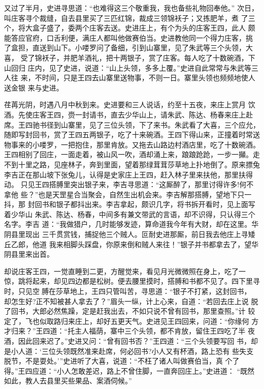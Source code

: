又过了半月，史进寻思道：“也难得这三个敬重我，我也备些礼物回奉他。”
次日，叫庄客寻个裁缝，自去县里买了三匹红锦，裁成三领锦袄子；又拣肥羊，煮
了三个，将大盒子盛了，委两个庄客去送。史进庄上，有个为头的庄客王四，此人
颇能答应官府，口舌利便，满庄人都叫他做赛伯当。史进教他同一个得力庄客，挑
了盒担，直送到山下。小喽罗问了备细，引到山寨里，见了朱武等三个头领，大喜，
受了锦袄子，并肥羊酒礼，把十两银子，赏了庄客。每人吃了十数碗酒，下山回归
庄内，见了史进，说道：“山上头领，多多上覆。”史进自此常常与朱武等三人往
来，不时间，只是王四去山寨里送物事，不则一日。寨里头领也频频地使人送金银
来与史进。

荏苒光阴，时遇八月中秋到来。史进要和三人说话，约至十五夜，来庄上赏月
饮酒。先使庄客王四，赍一封请书，直去少华山上，请朱武、陈达、杨春来庄上赴
席。王四驰书径到山寨里，见了三位头领，下了来书。朱武看了大喜，三个应允，
随即写封回书，赏了王四五两银子，吃了十来碗酒。王四下得山来，正撞着时常送
物事来的小喽罗，一把抱住，那里肯放。又拖去山路边村酒店里，吃了十数碗酒。
王四相别了回庄，一面走着，被山风一吹，酒却涌上来，踉踉跄跄，一步一攧。走
不到十里之路，见座林子，奔到里面，望着那绿茸茸莎草地上扑地倒了。原来摽兔
李吉正在那山坡下张兔儿，认得是史家庄上王四，赶入林子里来扶他，那里扶得动。
只见王四搭膊里突出银子来，李吉寻思道：“这厮醉了，那里讨得许多!何不拿他
些？”也是天罡星合当聚会，自然生出机会来。李吉解那搭膊，望地下只一抖，那
封回书和银子都抖出来。李吉拿起，颇识几字，将书拆开看时，见上面写着少华山
朱武、陈达、杨春，中间多有兼文带武的言语，却不识得，只认得三个名字。李吉
道：“我做猎户，几时能够发迹，算命道我今年有大财，却在这里。华阴县里现出
三千贯赏钱，捕捉他三个贼人。叵耐史进那厮，前日我去他庄上寻矮丘乙郎，他道
我来相脚头踩盘，你原来倒和贼人来往！”银子并书都拿去了，望华阴县里来出首。

却说庄客王四，一觉直睡到二更，方醒觉来，看见月光微微照在身上，吃了一
惊，跳将起来，却见四边都是松树。便去腰里摸时，搭膊和书都不见了。四下里寻
时，只见空膊在莎草地上，王四只管叫苦，寻思道：“银子不打紧，这封回书，
却怎生好?正不知被甚人拿去了？”眉头一纵，计上心来，自道：“若回去庄上说
脱了回书，大郎必然焦躁，定是赶我出去，不如只说不曾有回书，那里查照。”计
较定了，飞也似取路归来庄上，却好五更天气。史进见王四回来，问道：“你缘何
方才归来？”王四道：“托主人福荫，寨中三个头领，都不肯放，留住王四吃了半
夜酒，因此回来迟了。”史进又问：“曾有回书否？”王四道：“三个头领要写回
书，却是小人道：‘三位头领既然准来赴席，何必回书?小人又有杯酒，路上恐有
些失支脱节，不是耍处。’”史进听了大喜，说道：“不枉了诸人叫做赛伯当，真
个了得。”王四应道：“小人怎敢差迟，路上不曾住脚，一直奔回庄上。”史进道：
“既然如此，教人去县里买些果品、案酒伺候。”

